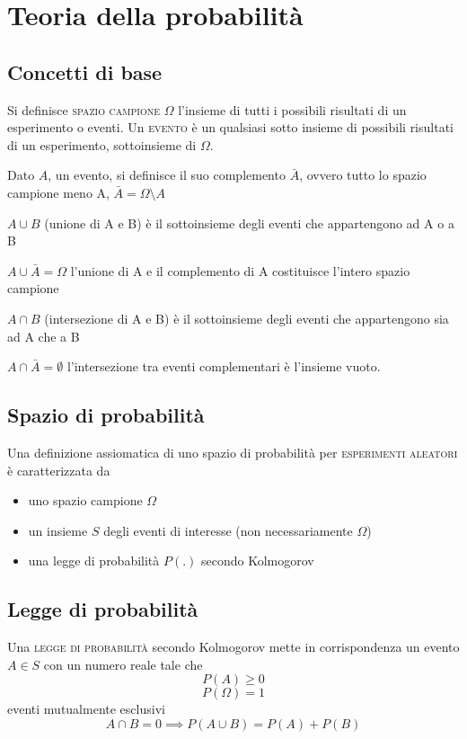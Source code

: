 \chapter{Teoria della probabilità}
\label{ch:teoriasegnali-capitolo4}
\section{Concetti di base}
Si definisce \textsc{spazio campione} $\Omega$ l'insieme di tutti i possibili risultati di un esperimento o eventi. Un \textsc{evento} è un qualsiasi sotto insieme di possibili risultati di un esperimento, sottoinsieme di $\Omega$.

Dato $A$, un evento, si definisce il suo complemento $\bar{A}$, ovvero tutto lo spazio campione meno A, $\bar{A}=\Omega\setminus A$

$A\cup B$ (unione di A e B) è il sottoinsieme degli eventi che appartengono ad A o a B

$A\cup\bar{A}=\Omega$ l'unione di A e il complemento di A costituisce l'intero spazio campione

$A\cap B$ (intersezione di A e B) è il sottoinsieme degli eventi che appartengono sia ad A che a B

$A\cap\bar{A}=\emptyset$ l'intersezione tra eventi complementari è l'insieme vuoto.

\section{Spazio di probabilità}
Una definizione assiomatica di uno spazio di probabilità per \textsc{esperimenti aleatori} è caratterizzata da
\begin{itemize}
	\item uno spazio campione $\Omega$
	\item un insieme $S$ degli eventi di interesse (non necessariamente $\Omega$)
	\item una legge di probabilità $P(.)$ secondo Kolmogorov
\end{itemize}

\section{Legge di probabilità}
Una \textsc{legge di probabilità} secondo Kolmogorov mette in corrispondenza un evento $A\in S$ con un numero reale tale che
\begin{equation}
	P(A)\geq 0
\end{equation}
\begin{equation}
	P(\Omega)=1
\end{equation}
eventi mutualmente esclusivi
\begin{equation}
	A\cap B=0\implies P(A\cup B)=P(A)+P(B)
\end{equation}


